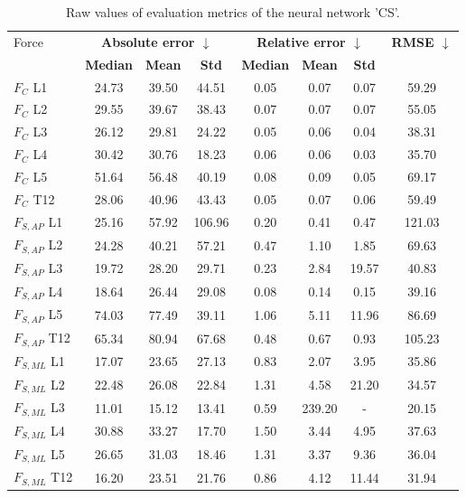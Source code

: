 \begin{table}[h]
\centering
\caption{Raw values of evaluation metrics of the neural network 'CS'.}
\label{tab:prelim:cs.tex}
\begin{tabular}{lccccccc}
\toprule
Force & \multicolumn{3}{c}{\bfseries Absolute error $\downarrow$} & \multicolumn{3}{c}{\bfseries Relative error $\downarrow$} & \bfseries RMSE $\downarrow$ \\
  & \bfseries Median & \bfseries Mean & \bfseries Std & \bfseries Median & \bfseries Mean & \bfseries Std & \bfseries   \\
\midrule
$F_{C}$ L1 & 24.73 & 39.50 & 44.51 & 0.05 & 0.07 & 0.07 & 59.29 \\
$F_{C}$ L2 & 29.55 & 39.67 & 38.43 & 0.07 & 0.07 & 0.07 & 55.05 \\
$F_{C}$ L3 & 26.12 & 29.81 & 24.22 & 0.05 & 0.06 & 0.04 & 38.31 \\
$F_{C}$ L4 & 30.42 & 30.76 & 18.23 & 0.06 & 0.06 & 0.03 & 35.70 \\
$F_{C}$ L5 & 51.64 & 56.48 & 40.19 & 0.08 & 0.09 & 0.05 & 69.17 \\
$F_{C}$ T12 & 28.06 & 40.96 & 43.43 & 0.05 & 0.07 & 0.06 & 59.49 \\
$F_{S,AP}$ L1 & 25.16 & 57.92 & 106.96 & 0.20 & 0.41 & 0.47 & 121.03 \\
$F_{S,AP}$ L2 & 24.28 & 40.21 & 57.21 & 0.47 & 1.10 & 1.85 & 69.63 \\
$F_{S,AP}$ L3 & 19.72 & 28.20 & 29.71 & 0.23 & 2.84 & 19.57 & 40.83 \\
$F_{S,AP}$ L4 & 18.64 & 26.44 & 29.08 & 0.08 & 0.14 & 0.15 & 39.16 \\
$F_{S,AP}$ L5 & 74.03 & 77.49 & 39.11 & 1.06 & 5.11 & 11.96 & 86.69 \\
$F_{S,AP}$ T12 & 65.34 & 80.94 & 67.68 & 0.48 & 0.67 & 0.93 & 105.23 \\
$F_{S,ML}$ L1 & 17.07 & 23.65 & 27.13 & 0.83 & 2.07 & 3.95 & 35.86 \\
$F_{S,ML}$ L2 & 22.48 & 26.08 & 22.84 & 1.31 & 4.58 & 21.20 & 34.57 \\
$F_{S,ML}$ L3 & 11.01 & 15.12 & 13.41 & 0.59 & 239.20 & - & 20.15 \\
$F_{S,ML}$ L4 & 30.88 & 33.27 & 17.70 & 1.50 & 3.44 & 4.95 & 37.63 \\
$F_{S,ML}$ L5 & 26.65 & 31.03 & 18.46 & 1.31 & 3.37 & 9.36 & 36.04 \\
$F_{S,ML}$ T12 & 16.20 & 23.51 & 21.76 & 0.86 & 4.12 & 11.44 & 31.94 \\
\bottomrule
\end{tabular}
\end{table}
